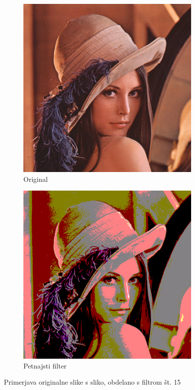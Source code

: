 \documentclass[a4paper, 12pt]{book}
\begin{document}
\begin{figure}[!ht]
    \centering
    \begin{subfigure}[b]{0.4\textwidth}
        \includegraphics[width=\textwidth]{lena}
        \caption{Original}
    \end{subfigure}
    \begin{subfigure}[b]{0.4\textwidth}
        \includegraphics[width=\textwidth]{lena_filter_15}
        \caption{Petnajsti filter}
    \end{subfigure}
    \caption{Primerjava originalne slike s sliko, obdelano s filtrom št. 15}
    \label{fig:lena_filter_15}
\end{figure}
\end{document}
